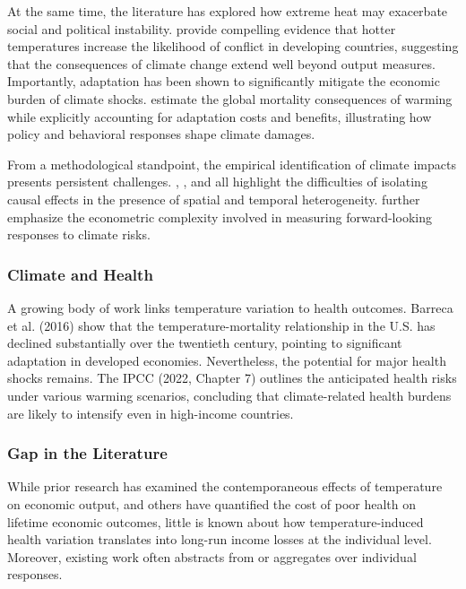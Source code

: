 \documentclass{article}
\begin{document}
At the same time, the literature has explored how extreme heat may exacerbate social and political instability.
\citep{doi:10.1126/science.1235367} provide compelling evidence that hotter temperatures increase the likelihood of conflict in developing countries, suggesting that the consequences of climate change extend well beyond output measures.
Importantly, adaptation has been shown to significantly mitigate the economic burden of climate shocks. 
\citep{Carleton_et_al_2022} estimate the global mortality consequences of warming while explicitly accounting for adaptation costs and benefits, illustrating how policy and behavioral responses shape climate damages.

From a methodological standpoint, the empirical identification of climate impacts presents persistent challenges.
\citep{Deryugina_Hsiang_2017}, \citep{Hsiang_2016},
and \citep{Nordhaus_2019} all highlight the difficulties of isolating causal effects in the presence of spatial and temporal heterogeneity.
\citep{Bilal_Kanzig_2024} further emphasize the econometric complexity involved in measuring forward-looking responses to climate risks.

\subsubsection{Climate and Health}

A growing body of work links temperature variation to health outcomes. Barreca et al. (2016) show that the temperature-mortality relationship in the U.S. has declined substantially over the twentieth century, pointing to significant adaptation in developed economies. Nevertheless, the potential for major health shocks remains. The IPCC (2022, Chapter 7) outlines the anticipated health risks under various warming scenarios, concluding that climate-related health burdens are likely to intensify even in high-income countries.

\subsubsection{Gap in the Literature}

While prior research has examined the contemporaneous
effects of temperature on economic output, and others
have quantified the cost of poor health on lifetime
economic outcomes, little is known about how
temperature-induced health variation translates
into long-run income losses at the individual level.
Moreover, existing work often abstracts from or aggregates
over individual responses.
\end{document}
